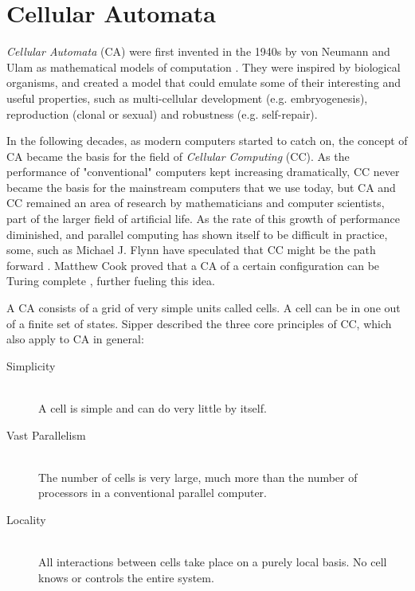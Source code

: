 \section{Cellular Automata}
\textit{Cellular Automata} (CA) were first invented in the 1940s by von Neumann and Ulam as mathematical models of computation \cite{von-neumann-1966}.
They were inspired by biological organisms,
and created a model that could emulate some of their interesting and useful properties,
such as multi-cellular development (e.g. embryogenesis), reproduction (clonal or sexual) and robustness (e.g. self-repair).

In the following decades, as modern computers started to catch on,
the concept of CA became the basis for the field of \textit{Cellular Computing} (CC).
As the performance of "conventional" computers kept increasing dramatically,
CC never became the basis for the mainstream computers that we use today,
but CA and CC remained an area of research by mathematicians and computer scientists,
part of the larger field of artificial life.
As the rate of this growth of performance diminished,
and parallel computing has shown itself to be difficult in practice,
some, such as Michael J. Flynn have speculated that CC might be the path forward \cite{flynn-1996} .
Matthew Cook proved that a CA of a certain configuration can be Turing complete \cite{cook-2004},
further fueling this idea.

A CA consists of a grid of very simple units called cells.
A cell can be in one out of a finite set of states.
Sipper \cite{sipper-1999} described the three core principles of CC, which also apply to CA in general:

\begin{description}
    \item[Simplicity]
        ~\\
        A cell is simple and can do very little by itself.
    \item[Vast Parallelism]
        ~\\
        The number of cells is very large, much more than the number of processors in a conventional parallel computer.
    \item[Locality]
        ~\\
        All interactions between cells take place on a purely local basis.
        No cell knows or controls the entire system.
\end{description}

